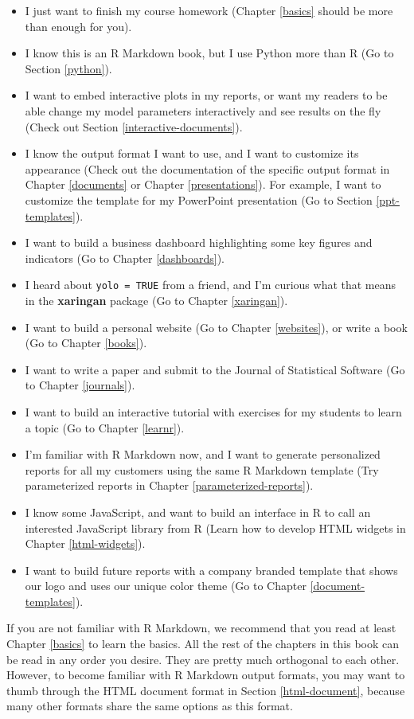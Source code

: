 \documentclass[
  11pt,
]{krantz}
\theoremstyle{definition}
\theoremstyle{definition}
\theoremstyle{definition}
\theoremstyle{definition}
\theoremstyle{remark}
\begin{document}
\begin{itemize}
\item
  I just want to finish my course homework (Chapter \ref{basics} should be more than enough for you).
\item
  I know this is an R Markdown book, but I use Python more than R (Go to Section \ref{python}).
\item
  I want to embed interactive plots in my reports, or want my readers to be able change my model parameters interactively and see results on the fly (Check out Section \ref{interactive-documents}).
\item
  I know the output format I want to use, and I want to customize its appearance (Check out the documentation of the specific output format in Chapter \ref{documents} or Chapter \ref{presentations}). For example, I want to customize the template for my PowerPoint presentation (Go to Section \ref{ppt-templates}).
\item
  I want to build a business dashboard highlighting some key figures and indicators (Go to Chapter \ref{dashboards}).
\item
  I heard about \texttt{yolo\ =\ TRUE} from a friend, and I'm curious what that means in the \textbf{xaringan} package (Go to Chapter \ref{xaringan}).
\item
  I want to build a personal website (Go to Chapter \ref{websites}), or write a book (Go to Chapter \ref{books}).
\item
  I want to write a paper and submit to the Journal of Statistical Software (Go to Chapter \ref{journals}).
\item
  I want to build an interactive tutorial with exercises for my students to learn a topic (Go to Chapter \ref{learnr}).
\item
  I'm familiar with R Markdown now, and I want to generate personalized reports for all my customers using the same R Markdown template (Try parameterized reports in Chapter \ref{parameterized-reports}).
\item
  I know some JavaScript, and want to build an interface in R to call an interested JavaScript library from R (Learn how to develop HTML widgets in Chapter \ref{html-widgets}).
\item
  I want to build future reports with a company branded template that shows our logo and uses our unique color theme (Go to Chapter \ref{document-templates}).
\end{itemize}

If you are not familiar with R Markdown, we recommend that you read at least Chapter \ref{basics} to learn the basics. All the rest of the chapters in this book can be read in any order you desire. They are pretty much orthogonal to each other. However, to become familiar with R Markdown output formats, you may want to thumb through the HTML document format in Section \ref{html-document}, because many other formats share the same options as this format.
\end{document}
